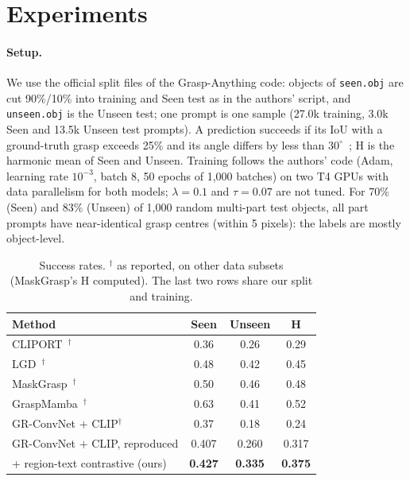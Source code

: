 \section{Experiments}
\label{sec:experiments}

\paragraph{Setup.}
We use the official split files of the Grasp-Anything code: objects of \texttt{seen.obj} are cut 90\%/10\% into training and Seen test as in the authors' script, and \texttt{unseen.obj} is the Unseen test; one prompt is one sample (27.0k training, 3.0k Seen and 13.5k Unseen test prompts).
A prediction succeeds if its IoU with a ground-truth grasp exceeds 25\% and its angle differs by less than $30^{\circ}$~\cite{kumra2020antipodal}; H is the harmonic mean of Seen and Unseen.
Training follows the authors' code (Adam, learning rate $10^{-3}$, batch 8, 50 epochs of 1,000 batches) on two T4 GPUs with data parallelism for both models; $\lambda = 0.1$ and $\tau = 0.07$ are not tuned.
For 70\% (Seen) and 83\% (Unseen) of 1,000 random multi-part test objects, all part prompts have near-identical grasp centres (within 5 pixels): the labels are mostly object-level.

\begin{table}[t]
  \centering
  \small
  \setlength{\tabcolsep}{4pt}
  \begin{tabular}{@{}lccc@{}}
    \toprule
    Method & Seen & Unseen & H \\
    \midrule
    CLIPORT~\cite{shridhar2021cliport}$^\dagger$ & 0.36 & 0.26 & 0.29 \\
    LGD~\cite{vuong2024language}$^\dagger$ & 0.48 & 0.42 & 0.45 \\
    MaskGrasp~\cite{vo2024maskgrasp}$^\dagger$ & 0.50 & 0.46 & 0.48 \\
    GraspMamba~\cite{nguyen2024graspmamba}$^\dagger$ & 0.63 & 0.41 & 0.52 \\
    \midrule
    GR-ConvNet + CLIP$^\dagger$ & 0.37 & 0.18 & 0.24 \\
    GR-ConvNet + CLIP, reproduced & 0.407 & 0.260 & 0.317 \\
    + region-text contrastive (ours) & \textbf{0.427} & \textbf{0.335} & \textbf{0.375} \\
    \bottomrule
  \end{tabular}
  \caption{Success rates. $^\dagger$ as reported, on other data subsets (MaskGrasp's H computed). The last two rows share our split and training.}
  \label{tab:main}
\end{table}

